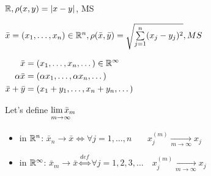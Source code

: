 \begin{ex}
  $\mathbb{R}, \rho(x, y) = |x - y|$, MS
\end{ex}
\begin{ex}
  $\bar{x} = (x_1, \dotsc, x_n) \in \mathbb{R}^n, \rho(\bar{x}, \bar{y}) = \sqrt{\sum\limits_{j = 1}^n(x_j - y_j)^2}, MS$
\end{ex}
\begin{ex}
    \hspace{-1.9em}$\begin{aligned}[t]
      \bar{x} &= (x_1, \dotsc, x_n, \dotso) \in \mathbb{R}^\infty \\
      \alpha\bar{x} &= (\alpha x_1, \dotsc, \alpha x_n, \dotsc) \\
      \bar{x} + \bar{y} &= (x_1 + y_1, \dotsc, x_n + y_n, \dotsc)
  \end{aligned}$

      Let's define $\alim{\bar{x}_m}{m \to \infty}$
      \begin{itemize}
          \item{in $\mathbb{R}^n$:}
              $\bar{x}_n \to \bar{x} \iff \forall j = 1, \dotsc, n\quad\ \ \:\,x_j^{(m)} \xrightarrow[m \to \infty]{} x_j$
          \item{in $\mathbb{R}^\infty$:}
              $\bar{x}_m \to \bar{x} \overset{def}{\iff} \forall j = 1,2,3,\dotso \quad x_j^{(m)} \xrightarrow[m \to \infty]{} x_j$
      \end{itemize}
\end{ex}
